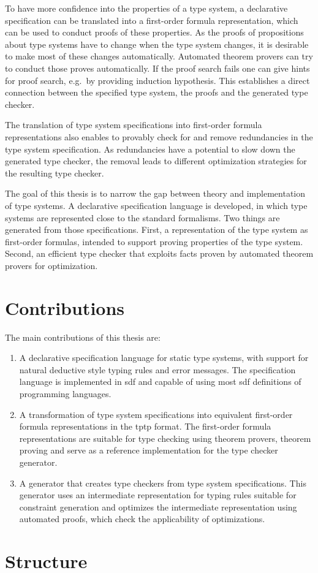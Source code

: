 To have more confidence into the properties of a type system, a
declarative specification can be translated into a first-order formula
representation, which can be used to conduct proofs of these
properties. As the proofs of propositions about type systems have to
change when the type system changes, it is desirable to make most of
these changes automatically. Automated theorem provers can try to
conduct those proves automatically. If the proof search fails one can
give hints for proof search, e.g.\ by providing induction
hypothesis. This establishes a direct connection between the specified
type system, the proofs and the generated type checker.

The translation of type system specifications into first-order formula
representations also enables to provably check for and remove
redundancies in the type system specification. As redundancies have a
potential to slow down the generated type checker, the removal leads
to different optimization strategies for the resulting type checker.

The goal of this thesis is to narrow the gap between theory and
implementation of type systems. A declarative specification language
is developed, in which type systems are represented close to the
standard formalisms. Two things are generated from those
specifications. First, a representation of the type system as
first-order formulas, intended to support proving properties of the
type system. Second, an efficient type checker that exploits facts
proven by automated theorem provers for optimization.

\section{Contributions}
The main contributions of this thesis are:
\begin{enumerate}
\item A declarative specification language for static type systems,
  with support for natural deductive style typing rules and error
  messages. The specification language is implemented in \gls{sdf} and
  capable of using most \gls{sdf} definitions of programming
  languages.
\item A transformation of type system specifications into equivalent
  first-order formula representations in the \gls{tptp} format. The
  first-order formula representations are suitable for type checking
  using theorem provers, theorem proving and serve as a reference
  implementation for the type checker generator.
\item A generator that creates type checkers from type system
  specifications. This generator uses an intermediate representation
  for typing rules suitable for constraint generation and optimizes
  the intermediate representation using automated proofs, which check
  the applicability of optimizations.
\end{enumerate}

\section{Structure}


